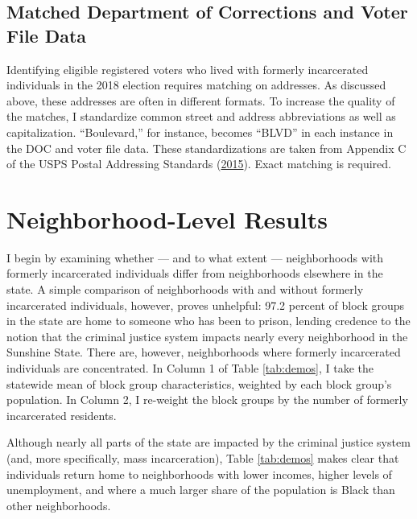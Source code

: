 \documentclass[
  12pt,
]{article}
\begin{document}
\hypertarget{matched-department-of-corrections-and-voter-file-data}{%
\subsection*{Matched Department of Corrections and Voter File Data}\label{matched-department-of-corrections-and-voter-file-data}}

Identifying eligible registered voters who lived with formerly incarcerated individuals in the 2018 election requires matching on addresses. As discussed above, these addresses are often in different formats. To increase the quality of the matches, I standardize common street and address abbreviations as well as capitalization. ``Boulevard,'' for instance, becomes ``BLVD'' in each instance in the DOC and voter file data. These standardizations are taken from Appendix C of the USPS Postal Addressing Standards (\protect\hyperlink{ref-USPS2015}{2015}). Exact matching is required.

\hypertarget{neighborhood-level-results}{%
\section*{Neighborhood-Level Results}\label{neighborhood-level-results}}

I begin by examining whether --- and to what extent --- neighborhoods with formerly incarcerated individuals differ from neighborhoods elsewhere in the state. A simple comparison of neighborhoods with and without formerly incarcerated individuals, however, proves unhelpful: 97.2 percent of block groups in the state are home to someone who has been to prison, lending credence to the notion that the criminal justice system impacts nearly every neighborhood in the Sunshine State. There are, however, neighborhoods where formerly incarcerated individuals are concentrated. In Column 1 of Table \ref{tab:demos}, I take the statewide mean of block group characteristics, weighted by each block group's population. In Column 2, I re-weight the block groups by the number of formerly incarcerated residents.



Although nearly all parts of the state are impacted by the criminal justice system (and, more specifically, mass incarceration), Table \ref{tab:demos} makes clear that individuals return home to neighborhoods with lower incomes, higher levels of unemployment, and where a much larger share of the population is Black than other neighborhoods.
\end{document}
